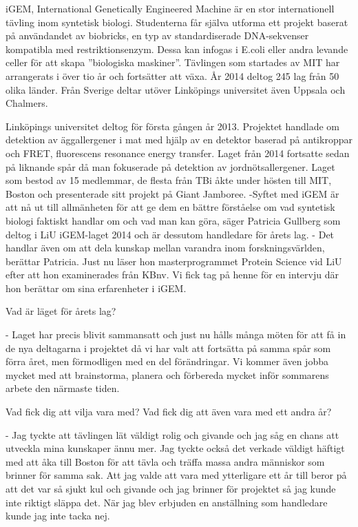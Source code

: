 iGEM, International Genetically Engineered Machine är en stor
internationell tävling inom syntetisk biologi. Studenterna får själva
utforma ett projekt baserat på användandet av biobricks, en typ av
standardiserade DNA-sekvenser kompatibla med restriktionsenzym. Dessa
kan infogas i E.coli eller andra levande celler för att skapa
”biologiska maskiner”. Tävlingen som startades av MIT har arrangerats
i över tio år och fortsätter att växa. År 2014 deltog 245 lag från 50
olika länder. Från Sverige deltar utöver Linköpings universitet även
Uppsala och Chalmers.





Linköpings universitet deltog för första gången år 2013. Projektet
handlade om detektion av äggallergener i mat med hjälp av en detektor
baserad på antikroppar och FRET, fluorescens resonance energy
transfer. Laget från 2014 fortsatte sedan på liknande spår då man
fokuserade på detektion av jordnötsallergener. Laget som bestod av 15
medlemmar, de flesta från TBi åkte under hösten till MIT, Boston och
presenterade sitt projekt på Giant Jamboree.  -Syftet med iGEM är att
nå ut till allmänheten för att ge dem en bättre förståelse om vad
syntetisk biologi faktiskt handlar om och vad man kan göra, säger
Patricia Gullberg som deltog i LiU iGEM-laget 2014 och är dessutom
handledare för årets lag.  - Det handlar även om att dela kunskap
mellan varandra inom forskningsvärlden, berättar Patricia. Just nu
läser hon masterprogrammet Protein Science vid LiU efter att hon
examinerades från KBnv. Vi fick tag på henne för en intervju där hon
berättar om sina erfarenheter i iGEM.

Vad är läget för årets lag?

- Laget har precis blivit sammansatt och just nu hålls många möten för
  att få in de nya deltagarna i projektet då vi har valt att fortsätta
  på samma spår som förra året, men förmodligen med en del
  förändringar. Vi kommer även jobba mycket med att brainstorma,
  planera och förbereda mycket inför sommarens arbete den närmaste
  tiden.

Vad fick dig att vilja vara med? Vad fick dig att även vara med ett andra år?

- Jag tyckte att tävlingen lät väldigt rolig och givande och jag såg
  en chans att utveckla mina kunskaper ännu mer. Jag tyckte också det
  verkade väldigt häftigt med att åka till Boston för att tävla och
  träffa massa andra människor som brinner för samma sak. Att jag
  valde att vara med ytterligare ett år till beror på att det var så
  sjukt kul och givande och jag brinner för projektet så jag kunde
  inte riktigt släppa det. När jag blev erbjuden en anställning som
  handledare kunde jag inte tacka nej.

